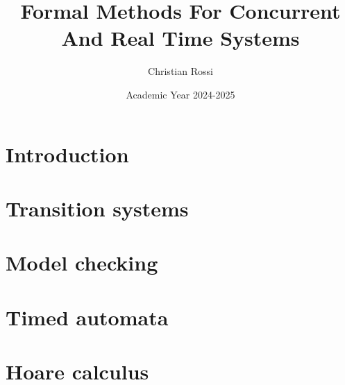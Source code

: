 \documentclass[12pt, a4paper]{report}
\title{\textbf{Formal Methods For Concurrent And Real Time Systems}}
\author{Christian Rossi}
\date{Academic Year 2024-2025}
\begin{document}
    \maketitle

    

    \cleardoublepage{}

    \tableofcontents

    \cleardoublepage{}

    \chapter{Introduction}
    
    
    

    \chapter{Transition systems}
    
    
    
    
    
    

    \chapter{Model checking}
    
    
    
    
    
    
    
    


    \chapter{Timed automata}


    \chapter{Hoare calculus}
\end{document}
